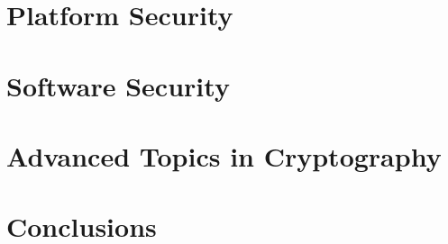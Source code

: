\documentclass[
letterpaper, %
oneside,
nobib
]{tufte-book}
\begin{document}
\part{Platform Security} 






\part{Software Security}

 
% 


\part{Advanced Topics in Cryptography}



\part{Conclusions}


\backmatter

\printbibliography
\end{document}
